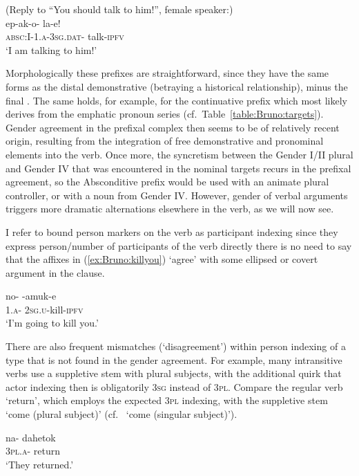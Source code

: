 \documentclass[output=collectionpaper]{langsci/langscibook}
\begin{document}
\ea
\label{ex:Bruno:epakolaxe}
(Reply to ``You should talk to him!'', female speaker:)\\
\gll ep-ak-o- la\GH-e!\\
\textsc{absc}:I-1.\textsc{a}-3\textsc{sg}.\textsc{dat}- talk-\textsc{ipfv}\\
\glt `I am talking to him!'
\z

Morphologically these prefixes are straightforward, since they have the same forms as the distal demonstrative  (betraying a historical relationship), minus the final . The same holds, for example, for the continuative prefix  which most likely derives from the emphatic pronoun series  (cf.\ Table~\ref{table:Bruno:targets}). Gender agreement in the prefixal complex then seems to be of relatively recent origin, resulting from the integration of free demonstrative and pronominal elements into the verb. Once more, the syncretism between the Gender I/II plural and Gender IV that was encountered in the nominal targets recurs in the prefixal agreement, so the Absconditive prefix  would be used with an animate plural controller, or with a noun from Gender IV. However, gender of verbal arguments triggers more dramatic alternations elsewhere in the verb, as we will now see.

I refer to bound person markers on the verb as participant indexing since they express person/number of participants of the verb directly \textendash{} there is no need to say that the affixes in (\ref{ex:Bruno:killyou}) `agree' with some ellipsed or covert argument in the clause.

\ea
\label{ex:Bruno:killyou}
\gll no- \GH-amuk-e\\
\textsc{1.a}- \textsc{2sg.u}-kill-\textsc{ipfv}\\
\glt `I'm going to kill you.'
\z

\noindent There are also frequent mismatches (`disagreement') within person indexing of a type that is not found in the gender agreement. For example, many intransitive verbs use a suppletive stem with plural subjects, with the additional quirk that actor indexing then is obligatorily 3\textsc{sg} instead of 3\textsc{pl}. Compare the regular verb  `return', which employs the expected 3\textsc{pl} indexing, with the suppletive stem  `come (plural subject)' (cf.\  `come (singular subject)').

\ea
\label{ex:Bruno:dahetok}
\gll na- dahetok\\
3\textsc{pl}.\textsc{a}- return\\
\glt `They returned.'
\z
\end{document}
